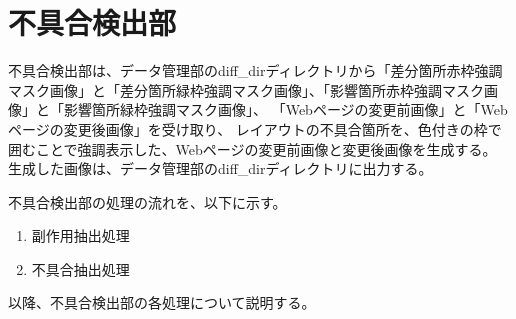 \section{不具合検出部}\label{sec:Layout_bug_extraction_section}
不具合検出部は、データ管理部のdiff\_dirディレクトリから「差分箇所赤枠強調マスク画像」と「差分箇所緑枠強調マスク画像」、「影響箇所赤枠強調マスク画像」と「影響箇所緑枠強調マスク画像」、
「Webページの変更前画像」と「Webページの変更後画像」を受け取り、
レイアウトの不具合箇所を、色付きの枠で囲むことで強調表示した、Webページの変更前画像と変更後画像を生成する。
生成した画像は、データ管理部のdiff\_dirディレクトリに出力する。
\par
不具合検出部の処理の流れを、以下に示す。
\begin{enumerate}
    \item 副作用抽出処理
    \item 不具合抽出処理
\end{enumerate}
以降、不具合検出部の各処理について説明する。

